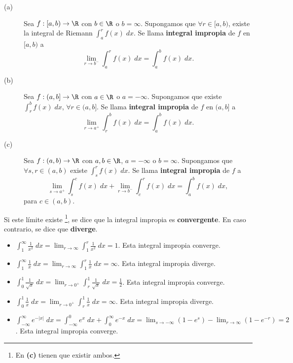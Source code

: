 \begin{fdefinition}
\normalfont 
\begin{description}
	\item[(a)] Sea $\displaystyle f : \left[a,b\right) \to \R  $ con $\displaystyle b \in \R $ o $\displaystyle b = \infty $. Supongamos que $\displaystyle \forall r \in [a,b)$, existe la integral de Riemann $\displaystyle \int^{r}_{a} f\left(x\right) \; dx $. Se llama \textbf{integral impropia} de $\displaystyle f $ en $\displaystyle [a,b) $ a
		\[\lim_{r \to b^{-}}\int^{r}_{a} f\left(x\right) \; dx = \int^{b}_{a} f\left(x\right) \; dx .\]
	
\item[(b)] Sea $\displaystyle f: (a,b]\to \R $ con $\displaystyle a \in \R $ o $\displaystyle a = -\infty  $. Supongamos que existe $\displaystyle \int^{b}_{r} f\left(x\right) \; dx$, $\displaystyle \forall r \in (a,b] $. Se llama \textbf{integral impropia} de $\displaystyle f $  en $\displaystyle (a,b] $ a
	\[\lim_{r \to a^{+}}\int^{b}_{r} f\left(x\right) \; dx = \int^{b}_{a} f\left(x\right) \; dx .\]
\item[(c)] Sea $\displaystyle f : \left(a,b\right) \to \R $ con $\displaystyle a,b \in \R $, $\displaystyle a = - \infty $ o $\displaystyle b = \infty $. Supongamos que $\displaystyle \forall s,r \in \left(a,b\right) $ existe $\displaystyle \int^{r}_{s} f\left(x\right) \; dx $. Se llama \textbf{integral impropia} de $\displaystyle f $ a
	\[\lim_{s \to a^{+}}\int^{c}_{s} f\left(x\right) \; dx + \lim_{r \to b^{-}} \int^{r}_{c} f\left(x\right) \; dx = \int^{b}_{a} f\left(x\right) \; dx,\]
	para $\displaystyle c \in \left(a,b\right) $.
\end{description}
Si este límite existe \footnote{En \textbf{(c)} tienen que existir ambos.}, se dice que la integral impropia es \textbf{convergente}. En caso contrario, se dice que \textbf{diverge}.
\end{fdefinition}
\begin{eg}
\normalfont 
\begin{itemize}
\item $\displaystyle \int^{\infty}_{1} \frac{1}{x^{2}} \; dx = \lim_{r \to \infty }\int^{r}_{1} \frac{1}{x^{2}} \; dx = 1 $. Esta integral impropia converge.
\item $\displaystyle \int^{\infty}_{1} \frac{1}{x} \; dx = \lim_{r \to \infty }\int^{r}_{1} \frac{1}{x} \; dx = \infty  $. Esta integral impropia diverge.
\item $\displaystyle \int^{1}_{0} \frac{1}{\sqrt{x}} \; dx = \lim_{r \to 0^{+}}\int^{1}_{r} \frac{1}{\sqrt{x}} \; dx = \frac{1}{2} $. Esta integral impropia converge.
\item $\displaystyle \int^{1}_{0} \frac{1}{x} \; dx = \lim_{r \to 0^{+}}\int^{1}_{r} \frac{1}{x} \; dx = \infty $. Esta integral impropia diverge.
\item $\displaystyle \int^{\infty}_{-\infty} e^{- \left|x\right|} \; dx = \int^{0}_{-\infty} e^{x} \; dx + \int^{\infty}_{0} e^{-x} \; dx = \lim_{s \to -\infty}\left(1-e^{s}\right) -\lim_{r \to \infty}\left(1 - e^{-r}\right) = 2 $. Esta integral impropia converge.
\end{itemize}
\end{eg}
